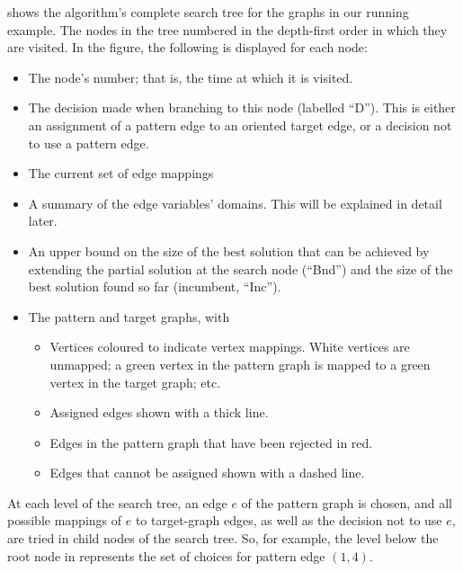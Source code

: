  shows the algorithm's complete search tree for the graphs in our running
example.  The nodes in the tree numbered in the depth-first order in which they are visited.  In the figure,
the following is displayed for each node:

\begin{itemize}
  \item The node's number; that is, the time at which it is visited.
  \item The decision made when branching to this node (labelled ``D''). This is either an assignment of
    a pattern edge to an oriented target edge, or a decision not to use a pattern edge.
  \item The current set of edge mappings
  \item A summary of the edge variables' domains.  This will be explained in detail later.
  \item An upper bound on the size of the best solution that can be achieved by extending the partial solution
    at the search node (``Bnd'') and the size of the best solution found so far (incumbent, ``Inc'').
  \item The pattern and target graphs, with
    \begin{itemize}
      \item Vertices coloured to indicate vertex mappings.  White vertices are unmapped; a green vertex in the pattern
        graph is mapped to a green vertex in the target graph; etc.
      \item Assigned edges shown with a thick line.
      \item Edges in the pattern graph that have been rejected in red.
      \item Edges that cannot be assigned shown with a dashed line.
    \end{itemize}
\end{itemize}

At each level of the search tree, an edge $e$ of the pattern graph is chosen, and all possible mappings of
$e$ to target-graph edges, as well as the decision not to use $e$, are tried in child nodes of the search tree.
So, for example, the level below the root node in  represents the set of choices for
pattern edge $(1,4)$.

